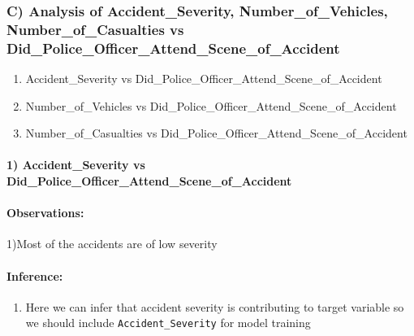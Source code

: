 \documentclass[11pt]{article}
\begin{document}
    \subsubsection{C) Analysis of Accident\_Severity, Number\_of\_Vehicles,
Number\_of\_Casualties vs
Did\_Police\_Officer\_Attend\_Scene\_of\_Accident}\label{c-analysis-of-accidentux5fseverity-numberux5fofux5fvehicles-numberux5fofux5fcasualties-vs-didux5fpoliceux5fofficerux5fattendux5fsceneux5fofux5faccident}

\begin{enumerate}
\def\labelenumi{\arabic{enumi})}
\itemsep1pt\parskip0pt
\item
  Accident\_Severity vs
  Did\_Police\_Officer\_Attend\_Scene\_of\_Accident
\item
  Number\_of\_Vehicles vs
  Did\_Police\_Officer\_Attend\_Scene\_of\_Accident
\item
  Number\_of\_Casualties vs
  Did\_Police\_Officer\_Attend\_Scene\_of\_Accident
\end{enumerate}

    \paragraph{1) Accident\_Severity vs
Did\_Police\_Officer\_Attend\_Scene\_of\_Accident}\label{accidentux5fseverity-vs-didux5fpoliceux5fofficerux5fattendux5fsceneux5fofux5faccident}

\paragraph{Observations:}\label{observations}

1)Most of the accidents are of low severity

\paragraph{Inference:}\label{inference}

\begin{enumerate}
\def\labelenumi{\arabic{enumi})}
\itemsep1pt\parskip0pt
\item
  Here we can infer that accident severity is contributing to target
  variable so we should include \texttt{Accident\_Severity} for model
  training
\end{enumerate}
\end{document}
